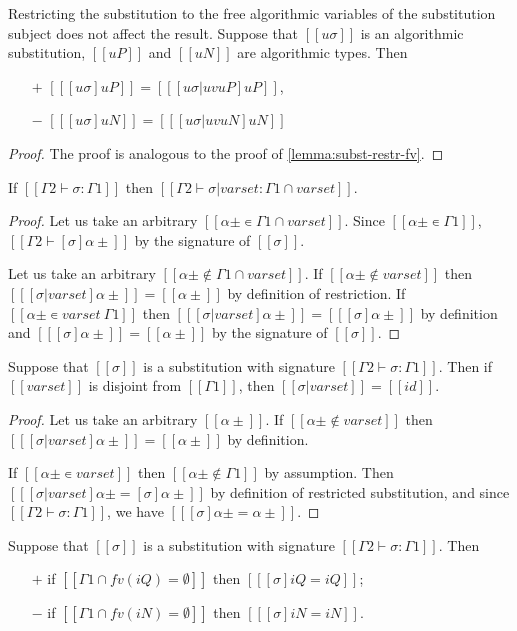 \begin{lemma}
  \label{lemma:subst-restr-uv}
  Restricting the substitution to the free algorithmic 
  variables of the
  substitution subject does not affect the result.
  Suppose that $[[uσ]]$ is an algorithmic substitution,
  $[[uP]]$ and $[[uN]]$ are algorithmic types. Then
 \begin{itemize}
    \item[$+$] $[[ [uσ]uP ]] = [[ [uσ|uv uP]uP ]]$,
    \item[$-$] $[[ [uσ]uN ]] = [[ [uσ|uv uN]uN ]]$
  \end{itemize}
\end{lemma}
\begin{proof}
  The proof is analogous to the proof of \cref{lemma:subst-restr-fv}.
\end{proof}

\begin{lemma}
  \label{lemma:subst-restr-sig}
  If $[[Γ2 ⊢ σ : Γ1]]$ then $[[Γ2 ⊢ σ|varset :  Γ1 ∩ varset]]$.
\end{lemma}
\begin{proof}
  Let us take an arbitrary $[[α± ∊ Γ1 ∩ varset]]$.
  Since $[[α± ∊ Γ1]]$, $[[Γ2 ⊢ [σ]α± ]]$ by the signature of $[[σ]]$.

  Let us take an arbitrary $[[α± ∉ Γ1 ∩ varset]]$.
  If $[[α± ∉ varset]]$ then $[[ [σ|varset]α± ]] = [[α±]]$ by definition
  of restriction. 
  If $[[α± ∊ varset \ Γ1]]$ then $[[ [σ|varset]α± ]] = [[ [σ]α± ]]$ by definition
  and $[[ [σ]α± ]] = [[α±]]$ by the signature of $[[σ]]$.
\end{proof}

\begin{lemma}
  Suppose that $[[σ]]$ is a substitution with signature $[[Γ2 ⊢ σ : Γ1]]$. 
  Then if $[[varset]]$ is disjoint from $[[Γ1]]$, 
  then $[[ σ|varset]] = [[ id ]]$. 
\end{lemma}
\begin{proof}
  Let us take an arbitrary $[[α±]]$.
  If $[[α± ∉ varset]]$ then $[[ [σ|varset]α±]] = [[α±]]$ by definition.

  If $[[α± ∊ varset]]$ then $[[α± ∉ Γ1]]$ by assumption.
  Then $[[ [σ|varset]α± = [σ]α±]]$ by definition of restricted substitution, and
  since $[[Γ2 ⊢ σ : Γ1]]$, we have $[[ [σ]α± = α± ]]$.
\end{proof}

\begin{corollary}
  \label{corollary:subst-disj}
  Suppose that $[[σ]]$ is a substitution with signature $[[Γ2 ⊢ σ : Γ1]]$. Then
  \begin{itemize}
    \item [$+$] if $[[Γ1 ∩ fv(iQ) = ∅]]$ then $[[ [σ] iQ = iQ]]$;
    \item [$-$] if $[[Γ1 ∩ fv(iN) = ∅]]$ then $[[ [σ] iN = iN]]$.
  \end{itemize}
\end{corollary}

